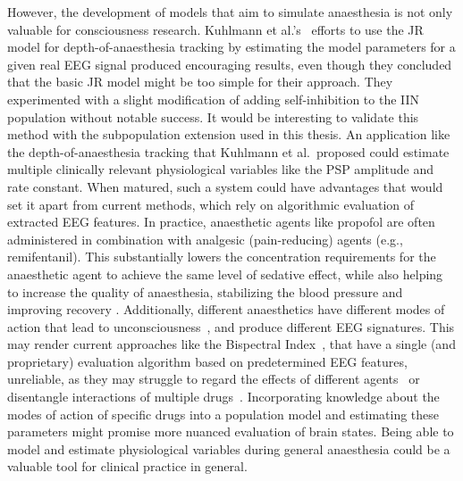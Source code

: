 However, the development of models that aim to simulate anaesthesia is not only valuable for consciousness research.
Kuhlmann et al.'s~\cite{kuhlmann_neural_2016} efforts to use the JR model for depth-of-anaesthesia tracking
by estimating the model parameters for a given real EEG signal produced encouraging results,
even though they concluded that the basic JR model might be too simple for their approach.
They experimented with a slight modification of adding self-inhibition to the IIN population without notable success.
It would be interesting to validate this method with the subpopulation extension used in this thesis.
An application like the depth-of-anaesthesia tracking that Kuhlmann et al.\ proposed
could estimate multiple clinically relevant physiological variables like the PSP amplitude and rate constant.
When matured, such a system could have advantages that would set it apart from current methods,
which rely on algorithmic evaluation of extracted EEG features.
In practice, anaesthetic agents like propofol are often administered in combination with analgesic (pain-reducing)
agents (e.g., remifentanil).
This substantially lowers the concentration requirements for the anaesthetic agent to achieve the same level of
sedative effect,
while also helping to increase the quality of anaesthesia, stabilizing the blood pressure and improving recovery
\cite{chen_propofol_2021}.
Additionally, different anaesthetics have different modes of action that
lead to unconsciousness~\cite{tantirigama_perspective_2020},
and produce different EEG signatures.
This may render current approaches like the Bispectral Index~\cite{mathur_bispectral_2022},
that have a single (and proprietary) evaluation algorithm based on predetermined EEG features,
unreliable, as they may struggle to regard the effects of different agents~\cite{avidan_prevention_2011}
or disentangle interactions of multiple drugs~\cite{kuhlmann_neural_2016}.
Incorporating knowledge about the modes of action of specific drugs into a population model
and estimating these parameters might promise more nuanced evaluation of brain states.
Being able to model and estimate physiological variables during general anaesthesia
could be a valuable tool for clinical practice in general.

